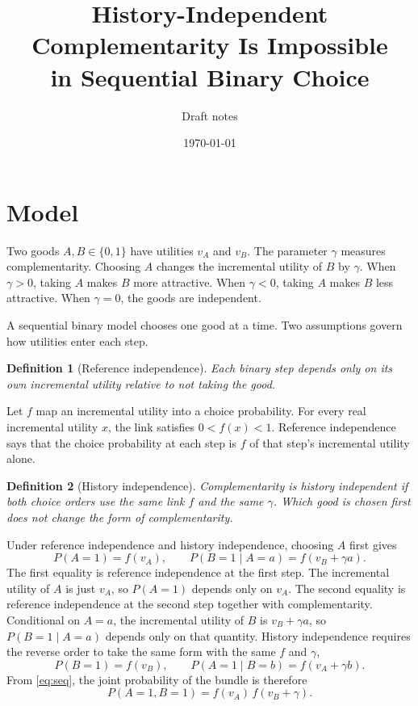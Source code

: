 \documentclass[11pt]{article}
\title{History-Independent Complementarity Is Impossible\\
in Sequential Binary Choice}
\author{Draft notes}
\date{\today}
\newtheorem{definition}{Definition}
\begin{document}
\maketitle

\section{Model}

Two goods $A,B\in\{0,1\}$ have utilities $v_A$ and $v_B$. The parameter
$\gamma$ measures complementarity. Choosing $A$ changes the incremental
utility of $B$ by $\gamma$. When $\gamma>0$, taking $A$ makes $B$ more
attractive. When $\gamma<0$, taking $A$ makes $B$ less attractive. When
$\gamma=0$, the goods are independent.

A sequential binary model chooses one good at a time. Two assumptions govern
how utilities enter each step.

\begin{definition}[Reference independence]
\label{def:ref}
Each binary step depends only on its own incremental utility relative to not
taking the good.
\end{definition}

Let $f$ map an incremental utility into a choice probability. For every
real incremental utility $x$, the link satisfies $0<f(x)<1$. Reference
independence says that the choice probability at each step is $f$ of that
step's incremental utility alone.

\begin{definition}[History independence]
\label{def:hist}
Complementarity is \emph{history independent} if both choice orders use the
same link $f$ and the same $\gamma$. Which good is chosen first does not
change the form of complementarity.
\end{definition}

Under reference independence and history independence, choosing $A$ first
gives
\begin{equation}\label{eq:seq}
P(A=1)=f(v_A),\qquad P(B=1\mid A=a)=f(v_B+\gamma a).
\end{equation}
The first equality is reference independence at the first step. The
incremental utility of $A$ is just $v_A$, so $P(A=1)$ depends only on $v_A$.
The second equality is reference independence at the second step together
with complementarity. Conditional on $A=a$, the incremental utility of $B$ is
$v_B+\gamma a$, so $P(B=1\mid A=a)$ depends only on that quantity. History
independence requires the reverse order to take the same form with the same
$f$ and $\gamma$,
\begin{equation}\label{eq:rev}
P(B=1)=f(v_B),\qquad P(A=1\mid B=b)=f(v_A+\gamma b).
\end{equation}
From \eqref{eq:seq}, the joint probability of the bundle is therefore
\begin{equation}\label{eq:joint}
P(A=1,B=1)=f(v_A)\,f(v_B+\gamma).
\end{equation}
\end{document}
